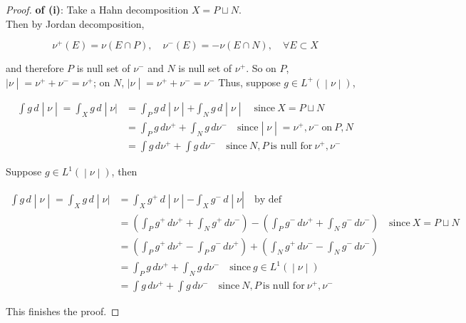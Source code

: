 \begin{proof}

\textbf{of (i)}: Take a Hahn decomposition \(X = P \sqcup N\).\\
Then by Jordan decomposition,

\[\nu^{+}(E) = \nu(E \cap P),\quad\nu^{-}(E) = - \nu(E \cap N),\quad\forall E \subset X\]

and therefore \(P\) is null set of \(\nu^{-}\) and \(N\) is null set of \(\nu^{+}\). So on \(P\), \(\left. |\nu \middle| = \nu^{+} + \nu^{-} = \nu^{+} \right.\); on \(N\), \(\left. |\nu \middle| = \nu^{+} + \nu^{-} = \nu^{-} \right.\) Thus, suppose \(\left. g \in L^{+}( \middle| \nu \middle| ) \right.\),

\[\begin{matrix}
\left. \int g\, d \middle| \nu \middle| = \int_{X}g\, d \middle| \nu| \right. & \left. = \int_{P}g\, d \middle| \nu \middle| + \int_{N}g\, d \middle| \nu \middle| \quad\text{since}\ X = P \sqcup N \right. \\
 & \left. = \int_{P}g\, d\nu^{+} + \int_{N}g\, d\nu^{-}\quad\text{since} \middle| \nu \middle| = \nu^{+},\nu^{-}\ \text{on}\ P,N \right. \\
 & {= \int g\, d\nu^{+} + \int g\, d\nu^{-}\quad\text{since}\ N,P\ \text{is null for}\ \nu^{+},\nu^{-}}
\end{matrix}\]

Suppose \(\left. g \in L^{1}( \middle| \nu \middle| ) \right.\), then

\[\begin{matrix}
\left. \int g\, d \middle| \nu \middle| = \int_{X}g\, d \middle| \nu| \right. & {\left. = \int_{X}g^{+}\, d \middle| \nu \middle| - \int_{X}g^{-}\, d \middle| \nu \right|\quad\text{by def}} \\
 & {= (\int_{P}g^{+}\, d\nu^{+} + \int_{N}g^{+}\, d\nu^{-}) - (\int_{P}g^{-}\, d\nu^{+} + \int_{N}g^{-}\, d\nu^{-})\quad\text{since}\ X = P \sqcup N} \\
 & {= (\int_{P}g^{+}\, d\nu^{+} - \int_{P}g^{-}\, d\nu^{+}) + (\int_{N}g^{+}\, d\nu^{-} - \int_{N}g^{-}\, d\nu^{-})} \\
 & \left. = \int_{P}g\, d\nu^{+} + \int_{N}g\, d\nu^{-}\quad\text{since}\ g \in L^{1}( \middle| \nu \middle| ) \right. \\
 & {= \int g\, d\nu^{+} + \int g\, d\nu^{-}\quad\text{since}\ N,P\ \text{is null for}\ \nu^{+},\nu^{-}}
\end{matrix}\]

This finishes the proof.

\end{proof}

